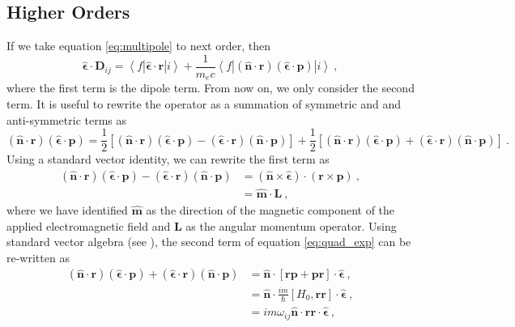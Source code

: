 \documentclass{article}
\begin{document}
\subsection{Higher Orders} \label{sec:HO}
If we take equation \ref{eq:multipole} to next order, then 
\begin{equation}
    \boldsymbol{\hat{\epsilon}}\cdot\mathbf{D}_{ij} = \left\langle f \left| \boldsymbol{\hat{\epsilon}}\cdot\mathbf{r} \right| i \right\rangle + \frac{1}{m_e c} \left\langle f \left| (\boldsymbol{\hat{n}}\cdot\mathbf{r}) ( \boldsymbol{\hat{\epsilon}}\cdot\mathbf{p}) \right| i \right\rangle~,
\end{equation}
where the first term is the dipole term. From now on, we only consider the second term. It is useful to rewrite the operator as a summation of symmetric and and anti-symmetric terms as
\begin{equation}\label{eq:quad_exp}
    (\boldsymbol{\hat{n}}\cdot\mathbf{r}) ( \boldsymbol{\hat{\epsilon}}\cdot\mathbf{p}) = \frac{1}{2}\left[(\boldsymbol{\hat{n}}\cdot\mathbf{r})(\boldsymbol{\hat{\epsilon}}\cdot\mathbf{p}) - (\boldsymbol{\hat{\epsilon}}\cdot\mathbf{r})(\boldsymbol{\hat{n}}\cdot\mathbf{p})\right] +  \frac{1}{2}\left[(\boldsymbol{\hat{n}}\cdot\mathbf{r})(\boldsymbol{\hat{\epsilon}}\cdot\mathbf{p}) + (\boldsymbol{\hat{\epsilon}}\cdot\mathbf{r})(\boldsymbol{\hat{n}}\cdot\mathbf{p})\right]~.
\end{equation}
Using a standard vector identity, we can rewrite the first term as 
\begin{align}
    (\boldsymbol{\hat{n}}\cdot\mathbf{r})(\boldsymbol{\hat{\epsilon}}\cdot\mathbf{p}) - (\boldsymbol{\hat{\epsilon}}\cdot\mathbf{r})(\boldsymbol{\hat{n}}\cdot\mathbf{p}) &= (\boldsymbol{\hat{n}} \times \boldsymbol{\hat{\epsilon}}) \cdot (\mathbf{r} \times \mathbf{p})~, \\
    &= \boldsymbol{\hat{m}}\cdot \mathbf{L}~,
\end{align}
where we have identified $\boldsymbol{\hat{m}}$ as the direction of the magnetic component of the applied electromagnetic field and $\mathbf{L}$ as the angular momentum operator. Using standard vector algebra (see \cite{Bernadotte2012}), the second term of equation \ref{eq:quad_exp} can be re-written as
\begin{align}
    (\boldsymbol{\hat{n}}\cdot\mathbf{r})(\boldsymbol{\hat{\epsilon}}\cdot\mathbf{p}) + (\boldsymbol{\hat{\epsilon}}\cdot\mathbf{r})(\boldsymbol{\hat{n}}\cdot\mathbf{p}) &= \boldsymbol{\hat{n}}\cdot \left[\mathbf{r}\mathbf{p} + \mathbf{p}\mathbf{r}\right]\cdot \boldsymbol{\hat{\epsilon}}~, \\
    &= \boldsymbol{\hat{n}}\cdot \frac{im}{\hbar}\left[H_0, \mathbf{rr}\right]\cdot \boldsymbol{\hat{\epsilon}}~, \\
    &= im\omega_{ij}\boldsymbol{\hat{n}}\cdot\mathbf{rr}\cdot \boldsymbol{\hat{\epsilon}}~,
\end{align}
\end{document}
